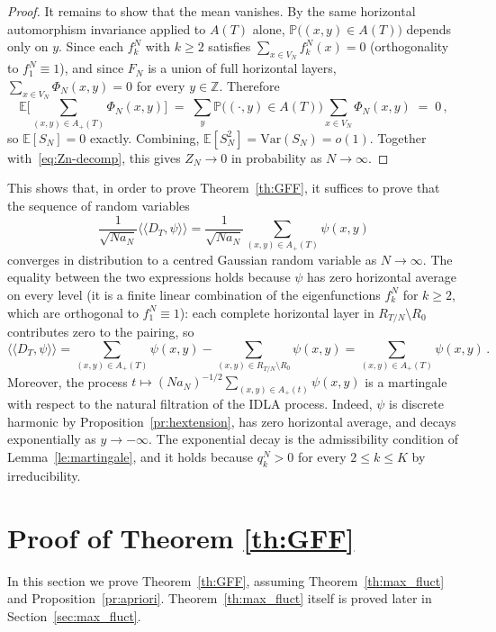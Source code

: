 \documentclass[11pt,a4paper,reqno]{amsart}
\theoremstyle{definition}
\newcommand{\bbE}{{\ensuremath{\mathbb E}} }
\newcommand{\bbP}{{\ensuremath{\mathbb P}} }
\newcommand{\bbZ}{{\ensuremath{\mathbb Z}} }
\newcommand{\laa}{\langle \! \langle}
\newcommand{\raa}{\rangle \! \rangle}
\begin{document}
\begin{proof}
It remains to show that the mean vanishes. By the same horizontal automorphism invariance applied to $A(T)$ alone, $\bbP\bigl((x, y) \in A(T)\bigr)$ depends only on $y$. Since each $f_k^N$ with $k \geq 2$ satisfies $\sum_{x \in V_N} f_k^N(x) = 0$ (orthogonality to $f_1^N \equiv 1$), and since $F_N$ is a union of full horizontal layers, $\sum_{x \in V_N} \Phi_N(x, y) = 0$ for every $y \in \bbZ$. Therefore
	\[ \bbE\!\bigg[ \sum_{(x,y) \in A_+(T)} \Phi_N(x,y) \bigg]
	\;=\; \sum_{y} \bbP\bigl((\cdot, y) \in A(T)\bigr) \sum_{x \in V_N} \Phi_N(x, y)
	\;=\; 0\,, \]
so $\bbE[S_N] = 0$ exactly. Combining, $\bbE[S_N^2] = \mathrm{Var}(S_N) = o(1)$. Together with~\eqref{eq:Zn-decomp}, this gives $Z_N \to 0$ in probability as $N \to \infty$.
\end{proof}

This shows that, in order to prove Theorem~\ref{th:GFF}, it suffices to prove that the sequence of random variables
	\[ \frac{1}{\sqrt{Na_N}} \laa D_T, \psi\raa
	= \frac{1}{\sqrt{Na_N}} \sum_{(x,y) \in A_+(T)} \psi(x, y) \]
converges in distribution to a centred Gaussian random variable as $N \to \infty$. The equality between the two expressions holds because $\psi$ has zero horizontal average on every level (it is a finite linear combination of the eigenfunctions $f_k^N$ for $k \geq 2$, which are orthogonal to $f_1^N \equiv 1$): each complete horizontal layer in $R_{T/N}\setminus R_0$ contributes zero to the pairing, so
	\[ \laa D_T, \psi\raa = \sum_{(x,y)\in A_+(T)} \psi(x, y) - \sum_{(x,y) \in R_{T/N}\setminus R_0} \psi(x, y) = \sum_{(x,y) \in A_+(T)} \psi(x, y)\,. \]
Moreover, the process $t \mapsto (Na_N)^{-1/2}\sum_{(x,y)\in A_+(t)} \psi(x, y)$ is a martingale with respect to the natural filtration of the IDLA process. Indeed, $\psi$ is discrete harmonic by Proposition~\ref{pr:hextension}, has zero horizontal average, and decays exponentially as $y \to -\infty$. The exponential decay is the admissibility condition of Lemma~\ref{le:martingale}, and it holds because $q_k^N > 0$ for every $2 \leq k \leq K$ by irreducibility.




\medskip 

\section{Proof of Theorem \ref{th:GFF}}\label{sec:proof_GFF}
In this section we prove Theorem~\ref{th:GFF}, assuming Theorem~\ref{th:max_fluct} and Proposition~\ref{pr:apriori}. Theorem~\ref{th:max_fluct} itself is proved later in Section~\ref{sec:max_fluct}. 
\end{document}
